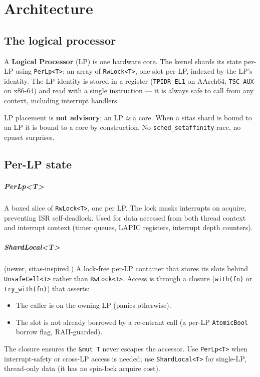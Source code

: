 \chapter{Architecture}

\section{The logical processor}

A \textbf{Logical Processor} (LP) is one hardware core. The kernel shards its
state per-LP using \texttt{PerLp<T>}: an array of \texttt{RwLock<T>}, one slot
per LP, indexed by the LP's identity. The LP identity is stored in a
register (\texttt{TPIDR\_EL1} on AArch64, \texttt{TSC\_AUX} on x86-64) and
read with a single instruction --- it is always safe to call from any context,
including interrupt handlers.

LP placement is \textbf{not advisory}: an LP \emph{is} a core. When a sitas
shard is bound to an LP it is bound to a core by construction. No
\texttt{sched\_setaffinity} race, no cpuset surprises.

\section{Per-LP state}

\paragraph{PerLp<T>} A boxed slice of \texttt{RwLock<T>}, one per LP. The lock
masks interrupts on acquire, preventing ISR self-deadlock. Used for data
accessed from both thread context and interrupt context (timer queues, LAPIC
registers, interrupt depth counters).

\paragraph{ShardLocal<T>} (newer, sitas-inspired.) A lock-free per-LP container
that stores its slots behind \texttt{UnsafeCell<T>} rather than
\texttt{RwLock<T>}. Access is through a closure (\texttt{with(fn)} or
\texttt{try\_with(fn)}) that asserts:
\begin{itemize}
    \item The caller is on the owning LP (panics otherwise).
    \item The slot is not already borrowed by a re-entrant call (a per-LP
        \texttt{AtomicBool} borrow flag, RAII-guarded).
\end{itemize}
The closure ensures the \texttt{\&mut T} never escapes the accessor. Use
\texttt{PerLp<T>} when interrupt-safety or cross-LP access is needed; use
\texttt{ShardLocal<T>} for single-LP, thread-only data (it has no spin-lock
acquire cost).


